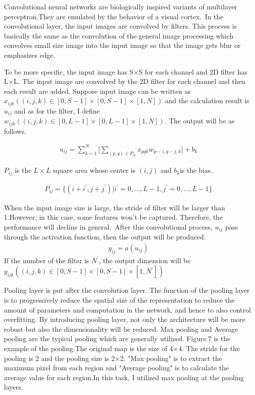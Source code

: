 Convolutional neural networks are biologically inspired variants of multilayer perceptron.They are emulated by the behavior of a visual cortex.\cite{cnn}\
In the convolutional layer, the input images are convolved by filters. This process is basically the same as the convolution of the general image processing which convolves small size image into the input image so that the image gets blur or emphasizes edge.

To be more specific, the input image has S$\times$S for each channel and 2D filter has L$\times$L.
The input image are convolved by the 2D filter for each channel and then each result are added. Suppose input image can be written as $x_{ijk} ((i,j,k)\in [0,S-1]\times[0,S-1]\times[1,N])$ and the calculation result is $u_{ij}$ and as for the filter, I define $w_{ijk} ((i,j,k)\in[0,L-1]\times[0,L-1]\times[1,N])$.
The output will be as follows.

\begin{eqnarray}
u_{ij}=\sum_{k=1}^{N}\biggl[\sum_{(p,q)\in P_{ij}}x_{pqk}w_{p-i,q-j,k}\biggl]+b_{k}
\end{eqnarray}

$P_{ij}$ is the $L\times L$ square area whose center is $(i,j)$ and $b_{k}$is the bias.

\begin{eqnarray}
P_{ij}=\{(i+i^{'},j+j^{'})| i^{'}=0,...,L-1,j^{'}=0,...,L-1\}
\end{eqnarray}

When the input image size is large, the stride of filter will be larger than 1.However, in this case, some features won't be captured. Therefore, the performance will decline in general.\
After this convolutional process, $u_{ij}$ pass through the activation function, then the output will be produced.
\begin{eqnarray}
y_{ij}=a(u_{ij})
\end{eqnarray}
If the number of the filter is $N^{'}$, the output dimension will be $y_{ijk} ((i,j,k)\in[0,S-1]\times [0,S-1]\times [1,N^{'}])$

Pooling layer is put after the convolution layer. %
The function of the pooling layer is to progressively reduce the spatial size of the representation to reduce the amount of parameters and computation in the network, and hence to also control overfitting.
By introducing pooling layer, not only the architecture will be more robust but also the dimensionality will be reduced. Max pooling and Average pooling are the typical pooling which are generally utilized. Figure.7 is the example of the pooling.The original map is the size of 4$\times$4. The stride for the pooling is 2 and the pooling size is 2$\times$2. "Max pooling" is to extract the maximum pixel from each region and "Average pooling" is to calculate the average value for each region.In this task, I utilized max pooling at the pooling layers.


